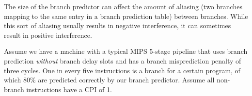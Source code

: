 \documentclass{exam}
\begin{document}
\begin{questions}
    \question The size of the branch predictor can affect the amount of aliasing
    (two branches mapping to the same entry in a branch prediction table)
    between branches. While this sort of aliasing usually results in negative
    interference, it can sometimes result in positive interference.


    \newpage
    \question Assume we have a machine with a typical MIPS 5-stage pipeline that
    uses branch prediction \textit{without} branch delay slots and has a branch
    misprediction penalty of three cycles. One in every five instructions is a
    branch for a certain program, of which 80\% are predicted correctly by our
    branch predictor. Assume all non-branch instructions have a CPI of 1.

\end{questions}
\end{document}

